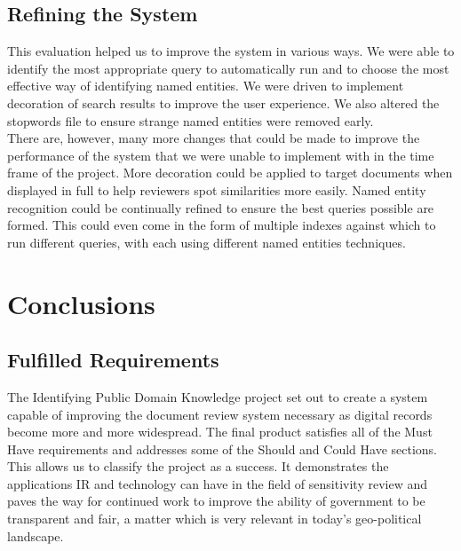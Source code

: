 \documentclass{l4proj}
\begin{document}
\section{Refining the System}
This evaluation helped us to improve the system in various ways.
We were able to identify the most appropriate query to automatically run and to choose the most effective way of identifying named entities.
We were driven to implement decoration of search results to improve the user experience.
We also altered the stopwords file to ensure strange named entities were removed early.\\
There are, however, many more changes that could be made to improve the performance of the system that we were unable to implement with in the time frame of the project.
More decoration could be applied to target documents when displayed in full to help reviewers spot similarities more easily.
Named entity recognition could be continually refined to ensure the best queries possible are formed. This could even come in the form of multiple indexes against which to run different queries, with each using different named entities techniques.

\chapter{Conclusions} \label{conclusion}
\section{Fulfilled Requirements}
The Identifying Public Domain Knowledge project set out to create a system capable of improving the document review system necessary as digital records become more and more widespread.
The final product satisfies all of the Must Have requirements and addresses some of the Should and Could Have sections. This allows us to classify the project as a success.
It demonstrates the applications IR and technology can have in the field of sensitivity review and paves the way for continued work to improve the ability of government to be transparent and fair, a matter which is very relevant in today's geo-political landscape.
\end{document}
